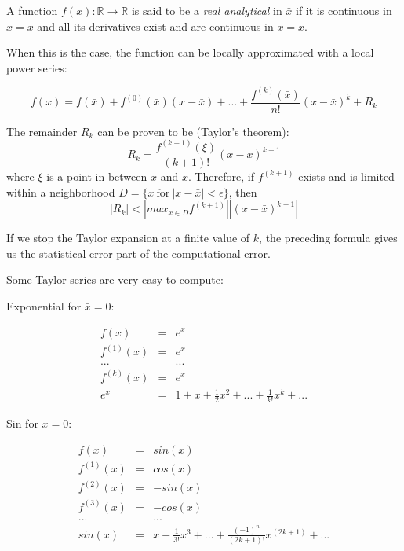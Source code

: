 \documentclass[justified, sixbynine]{tufte-book}
\theoremstyle{plain}%
\newtheorem * {corollary}{Corollary}
\theoremstyle{definition}
\theoremstyle{remark}
\newtheorem * {remark}{Remark}
\newtheorem * {note}{Note}
\begin{document}
\begin{fullwidth}

A function $f(x):\mathbb{R}\rightarrow\mathbb{R}$ is said to be a {\it real analytical} in $\bar x$ if it is continuous in $x=\bar x$ and all its derivatives exist and are continuous in $x=\bar x$.

When this is the case, the function can be locally approximated with a local power series:

\begin{equation}
f(x) = f(\bar x) + f^{(0)}(\bar x)(x-\bar x) + ... + \frac{f^{(k)}(\bar x)}{n!}(x-\bar x)^k + R_k
\end{equation}

The remainder $R_k$ can be proven to be (Taylor's theorem):
\begin{equation}
R_k = \frac{f^{(k+1)}(\xi)}{(k+1)!}(x-\bar x)^{k+1}
\end{equation}
where $\xi$ is a point in between $x$ and $\bar x$. Therefore, if $f^{(k+1)}$ exists and is limited within a neighborhood $D = \{x~\textrm{for}~|x-\bar x|<\epsilon\}$, then
\begin{equation}
|R_k| < \left| max_{x\in D} f^{(k+1)} \right| |(x-\bar x)^{k+1}|
\end{equation}

If we stop the Taylor expansion at a finite value of $k$, the preceding formula gives us the statistical error part of the computational error.

Some Taylor series are very easy to compute:

Exponential for $\bar x = 0$:

\begin{eqnarray}
f(x) &=& e^x \\
f^{(1)}(x) &=& e^x \\
... && ... \\
f^{(k)}(x) &=& e^x \\
e^x &=&  1 + x + \frac12 x^2 + ... + \frac1{k!}x^k + ...
\end{eqnarray}

Sin for $\bar x = 0$:

\begin{eqnarray}
f(x) &=& sin(x) \\
f^{(1)}(x) &=& cos(x) \\
f^{(2)}(x) &=& -sin(x) \\
f^{(3)}(x) &=& -cos(x) \\
... && ... \\
sin(x) &=&  x - \frac1{3!}x^3 + ... + \frac{(-1)^n}{(2k+1)!}x^{(2k+1)} + ...
\end{eqnarray}


\end{fullwidth}
\end{document}
